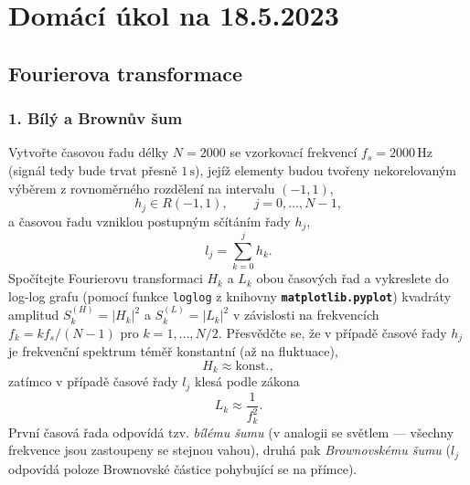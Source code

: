 \documentclass[a4paper,11pt,twoside]{article}
\def\abs#1{\left|#1\right|}
\def\code#1{\textnormal{\texttt{#1}}}
\def\file#1{\textnormal{\textbf{\texttt{#1}}}}
\begin{document}
\section*{Domácí úkol na 18.5.2023}
\subsection*{Fourierova transformace}

\subsubsection*{1. Bílý a Brownův šum}
    Vytvořte časovou řadu délky $N=2000$ se vzorkovací frekvencí $f_{s}=2000\,\text{Hz}$ (signál tedy bude trvat přesně $1\,\text{s}$), jejíž elementy budou tvořeny nekorelovaným výběrem z rovnoměrného rozdělení na intervalu $(-1,1)$,    
    \begin{equation*}
        h_{j}\in R(-1,1),\qquad j=0,\dotsc,N-1,
    \end{equation*}
    a časovou řadu vzniklou postupným sčítáním řady $h_{j}$,
    \begin{equation*}
        l_{j}=\sum_{k=0}^{j}h_{k}.
    \end{equation*}
    Spočítejte Fourierovu transformaci $H_{k}$ a $L_{k}$ obou časových řad a vykreslete do log-log grafu (pomocí funkce \code{loglog} z knihovny \file{matplotlib.pyplot}) kvadráty amplitud $S_{k}^{(H)}=\abs{H_{k}}^{2}$ a $S_{k}^{(L)}=\abs{L_{k}}^{2}$ v závislosti na frekvencích $f_{k}=k f_{s}/(N-1)$ pro $k=1,\dotsc,N/2$.
    Přesvědčte se, že v případě časové řady $h_{j}$ je frekvenční spektrum téměř konstantní (až na fluktuace), 
    \begin{equation*}
        H_{k}\approx\text{konst.},
    \end{equation*}
    zatímco v případě časové řady $l_{j}$ klesá podle zákona
    \begin{equation*}
        L_{k}\approx\frac{1}{f_{k}^{2}}.
    \end{equation*}
    První časová řada odpovídá tzv. \emph{bílému šumu} (v analogii se světlem --- všechny frekvence jsou zastoupeny se stejnou vahou), druhá pak \emph{Brownovskému šumu} ($l_{j}$ odpovídá poloze Brownovské částice pohybující se na přímce).
\end{document}

